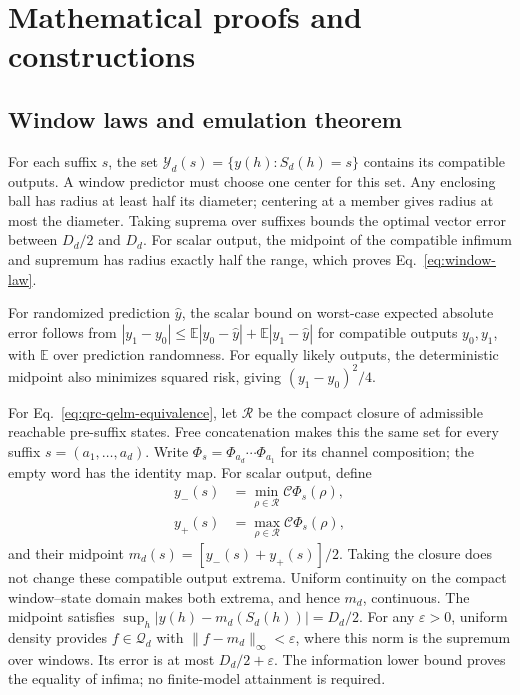 \appendix
\section{Mathematical proofs and constructions}
\label{app:proofs}

\subsection{Window laws and emulation theorem}
\label{app:window-laws}

For each suffix $s$, the set
$\mathcal Y_d(s)=\{y(h):S_d(h)=s\}$ contains its compatible outputs.
A window predictor must choose one center for this set. Any enclosing ball
has radius at least half its diameter; centering at a member gives radius
at most the diameter. Taking suprema over suffixes bounds the optimal
vector error between $D_d/2$ and $D_d$.
For scalar output, the midpoint of the compatible infimum and supremum has
radius exactly half the range, which proves Eq.~\eqref{eq:window-law}.

For randomized prediction $\widehat y$, the scalar bound on worst-case
expected absolute error follows from
$|y_1-y_0|\leq\mathbb E|y_0-\widehat y|+
\mathbb E|y_1-\widehat y|$ for compatible outputs $y_0,y_1$,
with $\mathbb E$ over prediction randomness. For equally likely outputs,
the deterministic midpoint also minimizes squared risk, giving
$(y_1-y_0)^2/4$.

For Eq.~\eqref{eq:qrc-qelm-equivalence}, let $\mathcal R$ be the compact
closure of admissible reachable pre-suffix states. Free concatenation makes
this the same set for every suffix $s=(a_1,\ldots,a_d)$. Write
$\Phi_s=\Phi_{a_d}\cdots\Phi_{a_1}$ for its channel composition;
the empty word has the identity map. For scalar output, define
\[
 \begin{aligned}
 y_-(s)&=\min_{\rho\in\mathcal R}\mathcal C\Phi_s(\rho),\\
 y_+(s)&=\max_{\rho\in\mathcal R}\mathcal C\Phi_s(\rho),
 \end{aligned}
\]
and their midpoint $m_d(s)=[y_-(s)+y_+(s)]/2$.
Taking the closure does not change these compatible output extrema.
Uniform continuity on the compact window--state domain makes both extrema,
and hence $m_d$, continuous. The midpoint satisfies
$\sup_h|y(h)-m_d(S_d(h))|=D_d/2$. For any $\varepsilon>0$, uniform density
provides $f\in\mathcal Q_d$ with $\|f-m_d\|_\infty<\varepsilon$,
where this norm is the supremum over windows. Its error is at most
$D_d/2+\varepsilon$. The information lower bound proves the equality
of infima; no finite-model attainment is required.

